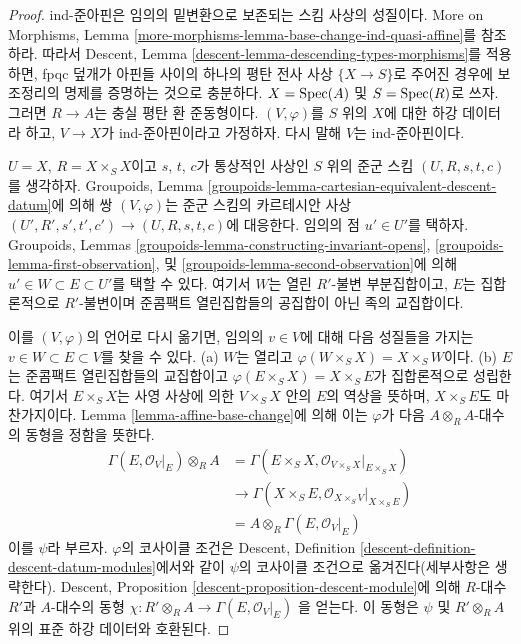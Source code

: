 \begin{proof}
ind-준아핀은 임의의 밑변환으로 보존되는 스킴 사상의 성질이다. More on
Morphisms, Lemma
\ref{more-morphisms-lemma-base-change-ind-quasi-affine}를 참조하라. 따라서
Descent, Lemma \ref{descent-lemma-descending-types-morphisms}를 적용하면,
fpqc 덮개가 아핀들 사이의 하나의 평탄 전사 사상 $\{X \to S\}$로 주어진
경우에 보조정리의 명제를 증명하는 것으로 충분하다. $X = \mathop{\mathrm{Spec}}(A)$ 및
$S = \mathop{\mathrm{Spec}}(R)$로 쓰자. 그러면 $R \to A$는 충실 평탄 환 준동형이다.
$(V, \varphi)$를 $S$ 위의 $X$에 대한 하강 데이터라 하고, $V \to X$가
ind-준아핀이라고 가정하자. 다시 말해 $V$는 ind-준아핀이다.

\medskip\noindent
$U = X$, $R = X \times_S X$이고 $s$, $t$, $c$가 통상적인 사상인 $S$ 위의
준군 스킴 $(U, R, s, t, c)$를 생각하자. Groupoids, Lemma
\ref{groupoids-lemma-cartesian-equivalent-descent-datum}에 의해 쌍
$(V, \varphi)$는 준군 스킴의 카르테시안 사상
$(U', R', s', t', c') \to (U, R, s, t, c)$에 대응한다. 임의의 점
$u' \in U'$를 택하자. Groupoids, Lemmas
\ref{groupoids-lemma-constructing-invariant-opens},
\ref{groupoids-lemma-first-observation}, 및
\ref{groupoids-lemma-second-observation}에 의해
$u' \in W \subset E \subset U'$를 택할 수 있다. 여기서 $W$는 열린
$R'$-불변 부분집합이고, $E$는 집합론적으로 $R'$-불변이며 준콤팩트
열린집합들의 공집합이 아닌 족의 교집합이다.

\medskip\noindent
이를 $(V, \varphi)$의 언어로 다시 옮기면, 임의의 $v \in V$에 대해 다음
성질들을 가지는 $v \in W \subset E \subset V$를 찾을 수 있다.
(a) $W$는 열리고 $\varphi(W \times_S X) = X \times_S W$이다.
(b) $E$는 준콤팩트 열린집합들의 교집합이고
$\varphi(E \times_S X) = X \times_S E$가 집합론적으로 성립한다.
여기서 $E \times_S X$는 사영 사상에 의한 $V \times_S X$ 안의 $E$의
역상을 뜻하며, $X \times_S E$도 마찬가지이다. Lemma
\ref{lemma-affine-base-change}에 의해 이는 $\varphi$가 다음
$A \otimes_R A$-대수의 동형을 정함을 뜻한다.
\begin{align*}
\Gamma(E, \mathcal{O}_V|_E) \otimes_R A
& =
\Gamma(E \times_S X, \mathcal{O}_{V \times_S X}|_{E \times_S X}) \\
& \to
\Gamma(X \times_S E, \mathcal{O}_{X \times_S V}|_{X \times_S E}) \\
& =
A \otimes_R \Gamma(E, \mathcal{O}_V|_E)
\end{align*}
이를 $\psi$라 부르자. $\varphi$의 코사이클 조건은 Descent, Definition
\ref{descent-definition-descent-datum-modules}에서와 같이 $\psi$의 코사이클
조건으로 옮겨진다(세부사항은 생략한다). Descent, Proposition
\ref{descent-proposition-descent-module}에 의해 $R$-대수 $R'$과
$A$-대수의 동형
$\chi : R' \otimes_R A \to \Gamma(E, \mathcal{O}_V|_E)$
을 얻는다. 이 동형은 $\psi$ 및 $R' \otimes_R A$ 위의 표준 하강 데이터와
호환된다.


\end{proof}
